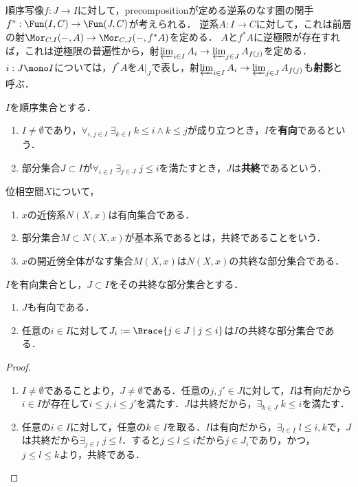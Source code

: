 \documentclass[uplatex,dvipdfmx]{jsreport}
\begin{document}
\begin{definition}[もう一つの射影]
    順序写像$f:J\to I$に対して，precompositionが定める逆系のなす圏の関手$f^*:\Fun(I,C)\to\Fun(J,C)$が考えられる．
    逆系$A:I\to C$に対して，これは前層の射$\Mor_{C,I}(-,A)\to\Mor_{C,J}(-,f^*A)$を定める．
    $A$と$f^*A$に逆極限が存在すれば，これは逆極限の普遍性から，射$\varprojlim_{i\in I}A_i\to\varprojlim_{j\in J}A_{f(j)}$を定める．
    $i:J\mono I$については，$f^*A$を$A|_J$で表し，射$\varprojlim_{i\in I}A_i\to\varprojlim_{j\in J}A_{f(j)}$も\textbf{射影}と呼ぶ．
\end{definition}

\begin{definition}
    $I$を順序集合とする．
    \begin{enumerate}
        \item $I\ne\emptyset$であり，$\forall_{i,j\in I}\;\exists_{k\in I}\;k\le i\land k\le j$が成り立つとき，$I$を\textbf{有向}であるという．
        \item 部分集合$J\subset I$が$\forall_{i\in I}\;\exists_{j\in J}\;j\le i$を満たすとき，$J$は\textbf{共終}であるという．
    \end{enumerate}
\end{definition}
\begin{example}
    位相空間$X$について，
    \begin{enumerate}
        \item $x$の近傍系$N(X,x)$は有向集合である．
        \item 部分集合$M\subset N(X,x)$が基本系であるとは，共終であることをいう．
        \item $x$の開近傍全体がなす集合$M(X,x)$は$N(X,x)$の共終な部分集合である．
    \end{enumerate}
\end{example}

\begin{proposition}
    $I$を有向集合とし，$J\subset I$をその共終な部分集合とする．
    \begin{enumerate}
        \item $J$も有向である．
        \item 任意の$i\in I$に対して$J_i:=\Brace{j\in J\mid j\le i}$は$I$の共終な部分集合である．
    \end{enumerate}
\end{proposition}
\begin{proof}\mbox{}
    \begin{enumerate}
        \item $I\ne\emptyset$であることより，$J\ne\emptyset$である．任意の$j,j'\in J$に対して，$I$は有向だから$i\in I$が存在して$i\le j,i\le j'$を満たす．$J$は共終だから，$\exists_{k\in J}\;k\le i$を満たす．
        \item 任意の$i\in I$に対して，任意の$k\in I$を取る．$I$は有向だから，$\exists_{l\in I}\;l\le i,k$で，$J$は共終だから$\exists_{j\in I}\;j\le l$．すると$j\le l\le i$だから$j\in J_i$であり，かつ，$j\le l\le k$より，共終である．
    \end{enumerate}
\end{proof}
\end{document}
